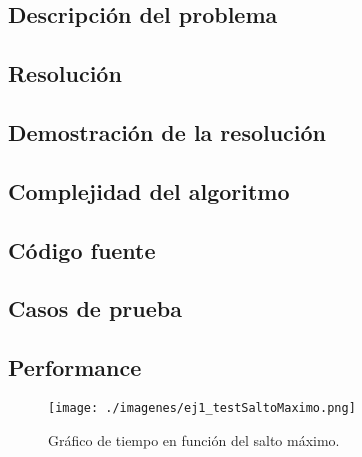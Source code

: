 \subsection{Descripci\'on del problema}



\subsection{Resoluci\'on}



\subsection{Demostraci\'on de la resoluci\'on}


\subsection{Complejidad del algoritmo}


\subsection{C\'odigo fuente}


\subsection{Casos de prueba}


\subsection{Performance}



\begin{figure}[H]
\begin{center}
\texttt{[image: ./imagenes/ej1\_testSaltoMaximo.png]}
\caption{Gr\'afico de tiempo en funci\'on del salto m\'aximo.}
\end{center}
\end{figure}

